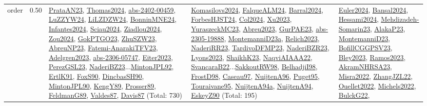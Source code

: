 {\begin{longtable}{p{3cm}r>{\raggedright\arraybackslash}p{6cm}>{\raggedright\arraybackslash}p{6cm}>{\raggedright\arraybackslash}p{8cm}}
\index{order}\index{Scheduling!order}order &  0.50 & \hyperref[detail:PrataAN23]{PrataAN23}, \hyperref[detail:Thomas2024]{Thomas2024}, \hyperref[detail:abs-2402-00459]{abs-2402-00459}, \hyperref[detail:LuZZYW24]{LuZZYW24}, \hyperref[detail:LiLZDZW24]{LiLZDZW24}, \hyperref[detail:BonninMNE24]{BonninMNE24}, \hyperref[detail:Infantes2024]{Infantes2024}, \hyperref[detail:Sciau2024]{Sciau2024}, \hyperref[detail:Ziadlou2024]{Ziadlou2024}, \hyperref[detail:Zou2024]{Zou2024}, \hyperref[detail:GokPTGO23]{GokPTGO23}, \hyperref[detail:ZhuSZW23]{ZhuSZW23}, \hyperref[detail:AbreuNP23]{AbreuNP23}, \hyperref[detail:Fatemi-AnarakiTFV23]{Fatemi-AnarakiTFV23}, \hyperref[detail:Adelgren2023]{Adelgren2023}, \hyperref[detail:abs-2306-05747]{abs-2306-05747}, \hyperref[detail:Eiter2023]{Eiter2023}, \hyperref[detail:PerezGSL23]{PerezGSL23}, \hyperref[detail:NaderiBZ23]{NaderiBZ23}...\hyperref[detail:MintonJPL92]{MintonJPL92}, \hyperref[detail:ErtlK91]{ErtlK91}, \hyperref[detail:FoxS90]{FoxS90}, \hyperref[detail:DincbasSH90]{DincbasSH90}, \hyperref[detail:MintonJPL90]{MintonJPL90}, \hyperref[detail:KengY89]{KengY89}, \hyperref[detail:Prosser89]{Prosser89}, \hyperref[detail:FeldmanG89]{FeldmanG89}, \hyperref[detail:Valdes87]{Valdes87}, \hyperref[detail:Davis87]{Davis87} (Total: 730) & \hyperref[detail:Komasilovs2024]{Komasilovs2024}, \hyperref[detail:FalqueALM24]{FalqueALM24}, \hyperref[detail:Barral2024]{Barral2024}, \hyperref[detail:ForbesHJST24]{ForbesHJST24}, \hyperref[detail:Col2024]{Col2024}, \hyperref[detail:Xu2023]{Xu2023}, \hyperref[detail:YuraszeckMC23]{YuraszeckMC23}, \hyperref[detail:Abreu2023]{Abreu2023}, \hyperref[detail:GurPAE23]{GurPAE23}, \hyperref[detail:abs-2305-19888]{abs-2305-19888}, \hyperref[detail:MontemanniD23a]{MontemanniD23a}, \hyperref[detail:Relich2023]{Relich2023}, \hyperref[detail:NaderiRR23]{NaderiRR23}, \hyperref[detail:TardivoDFMP23]{TardivoDFMP23}, \hyperref[detail:NaderiBZR23]{NaderiBZR23}, \hyperref[detail:Lyons2023]{Lyons2023}, \hyperref[detail:ShaikhK23]{ShaikhK23}, \hyperref[detail:NaqviAIAAA22]{NaqviAIAAA22}, \hyperref[detail:SvancaraB22]{SvancaraB22}...\hyperref[detail:SakkoutRW98]{SakkoutRW98}, \hyperref[detail:BelhadjiI98]{BelhadjiI98}, \hyperref[detail:FrostD98]{FrostD98}, \hyperref[detail:Caseau97]{Caseau97}, \hyperref[detail:NuijtenA96]{NuijtenA96}, \hyperref[detail:Puget95]{Puget95}, \hyperref[detail:Touraivane95]{Touraivane95}, \hyperref[detail:NuijtenA94a]{NuijtenA94a}, \hyperref[detail:NuijtenA94]{NuijtenA94}, \hyperref[detail:EskeyZ90]{EskeyZ90} (Total: 195) & \hyperref[detail:Euler2024]{Euler2024}, \hyperref[detail:Bansal2024]{Bansal2024}, \hyperref[detail:Hessami2024]{Hessami2024}, \hyperref[detail:Mehdizadeh-Somarin23]{Mehdizadeh-Somarin23}, \hyperref[detail:AlakaP23]{AlakaP23}, \hyperref[detail:MontemanniD23]{MontemanniD23}, \hyperref[detail:BofillCGGPSV23]{BofillCGGPSV23}, \hyperref[detail:Bley2023]{Bley2023}, \hyperref[detail:Ramos2023]{Ramos2023}, \hyperref[detail:AkramNHRSA23]{AkramNHRSA23}, \hyperref[detail:Misra2022]{Misra2022}, \hyperref[detail:ZhangJZL22]{ZhangJZL22}, \hyperref[detail:Ouellet2022]{Ouellet2022}, \hyperref[detail:Michels2022]{Michels2022}, \hyperref[detail:BulckG22]{BulckG22}, 
\end{longtable}}
